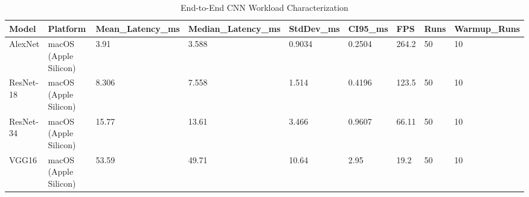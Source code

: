 \begin{table}[t]
\centering
\begin{tabular}{lllllllll}
\toprule
Model & Platform & Mean\_Latency\_ms & Median\_Latency\_ms & StdDev\_ms & CI95\_ms & FPS & Runs & Warmup\_Runs \\
\midrule
AlexNet & macOS (Apple Silicon) & 3.91 & 3.588 & 0.9034 & 0.2504 & 264.2 & 50 & 10 \\
ResNet-18 & macOS (Apple Silicon) & 8.306 & 7.558 & 1.514 & 0.4196 & 123.5 & 50 & 10 \\
ResNet-34 & macOS (Apple Silicon) & 15.77 & 13.61 & 3.466 & 0.9607 & 66.11 & 50 & 10 \\
VGG16 & macOS (Apple Silicon) & 53.59 & 49.71 & 10.64 & 2.95 & 19.2 & 50 & 10 \\
\bottomrule
\end{tabular}
\caption{End-to-End CNN Workload Characterization}
\end{table}
